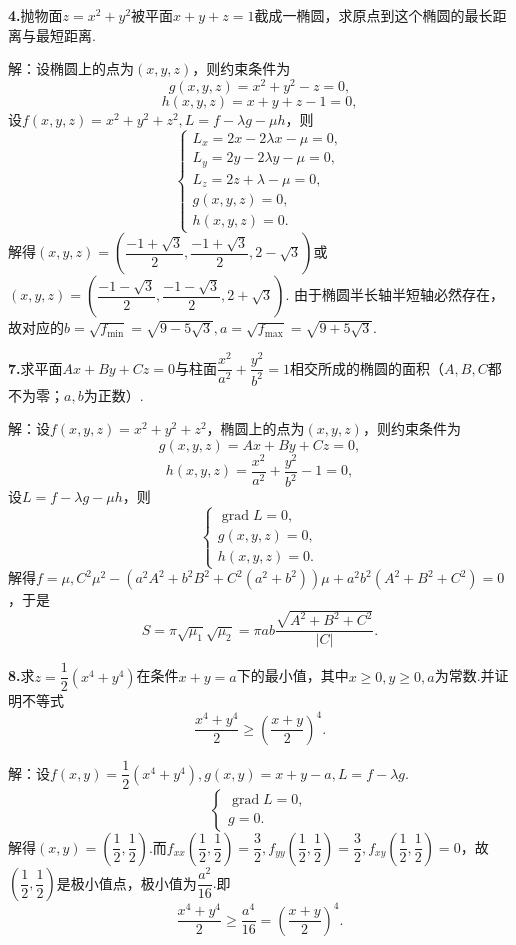 \documentclass[12pt, a4paper]{article}
\begin{document}
\textbf{4.}抛物面\(z = x^2 + y^2\)被平面\(x + y + z = 1\)截成一椭圆，求原点到这个椭圆的最长距离与最短距离.

解：设椭圆上的点为\((x, y, z)\)，则约束条件为
\[g(x, y, z) = x^2 + y^2 - z = 0,\]
\[h(x, y, z) = x + y + z - 1 = 0,\]
设\(f(x, y, z) = x^2 + y^2 + z^2, L = f - \lambda g - \mu h\)，则
\[\begin{cases}
L_x = 2x - 2\lambda x - \mu = 0,\\
L_y = 2y - 2\lambda y - \mu = 0,\\
L_z = 2z + \lambda - \mu = 0,\\
g(x, y, z) = 0,\\
h(x, y, z) = 0.
\end{cases}\]
解得\((x, y, z) = \left(\dfrac{-1 + \sqrt{3}}{2}, \dfrac{-1 + \sqrt{3}}{2}, 2 - \sqrt{3}\right)\)或\((x, y, z) = \left(\dfrac{-1 - \sqrt{3}}{2}, \dfrac{-1 - \sqrt{3}}{2}, 2 + \sqrt{3}\right).\)
由于椭圆半长轴半短轴必然存在，故对应的\(b = \sqrt{f_{\text{min}}} = \sqrt{9 - 5\sqrt{3}}, a = \sqrt{f_{\text{max}}} = \sqrt{9 + 5\sqrt{3}}.\)

\textbf{7.}求平面\(Ax + By + Cz = 0\)与柱面\(\dfrac{x^2}{a^2} + \dfrac{y^2}{b^2} = 1\)相交所成的椭圆的面积（\(A, B, C\)都不为零；\(a, b\)为正数）.

解：设\(f(x, y, z) = x^2 + y^2 + z^2\)，椭圆上的点为\((x, y, z)\)，则约束条件为
\[g(x, y, z) = Ax + By + Cz = 0,\]
\[h(x, y, z) = \frac{x^2}{a^2} + \frac{y^2}{b^2} - 1 = 0,\]
设\(L = f - \lambda g - \mu h\)，则
\[\begin{cases}
\operatorname{grad} L = 0,\\
g(x, y, z) = 0,\\
h(x, y, z) = 0.
\end{cases}\]
解得\(f = \mu, C^2\mu^2 - (a^2A^2 + b^2B^2 + C^2(a^2 + b^2))\mu + a^2b^2(A^2 + B^2 + C^2) = 0\)，于是
\[S = \pi\sqrt{\mu_1}\sqrt{\mu_2} = \pi ab\frac{\sqrt{A^2 + B^2 + C^2}}{|C|}.\]

\textbf{8.}求\(z = \dfrac{1}{2}(x^4 + y^4)\)在条件\(x + y = a\)下的最小值，其中\(x \geq 0, y \geq 0, a\)为常数.并证明不等式
\[\frac{x^4 + y^4}{2} \geq \left(\frac{x + y}{2}\right)^4.\]

解：设\(f(x, y) = \dfrac{1}{2}(x^4 + y^4), g(x, y) = x + y - a, L = f - \lambda g.\)
\[\begin{cases}
\operatorname{grad} L = 0,\\
g = 0.
\end{cases}\]
解得\((x, y) = \left(\dfrac{1}{2}, \dfrac{1}{2}\right).\)而\(f_{xx}\left(\dfrac{1}{2}, \dfrac{1}{2}\right) = \dfrac{3}{2}, f_{yy}\left(\dfrac{1}{2}, \dfrac{1}{2}\right) = \dfrac{3}{2}, f_{xy}\left(\dfrac{1}{2}, \dfrac{1}{2}\right) = 0\)，故\(\left(\dfrac{1}{2}, \dfrac{1}{2}\right)\)是极小值点，极小值为\(\dfrac{a^2}{16}.\)即
\[\frac{x^4 + y^4}{2} \geq \frac{a^4}{16} = \left(\frac{x + y}{2}\right)^4.\]
\end{document}
